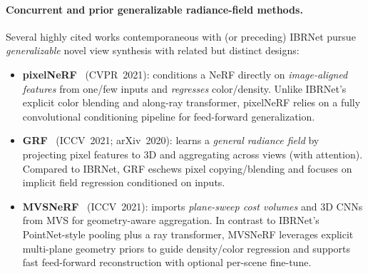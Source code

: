 \begin{enrichment}
\begin{enrichment}
     \paragraph{Concurrent and prior generalizable radiance-field methods.}
     Several highly cited works contemporaneous with (or preceding) IBRNet pursue \emph{generalizable} novel view synthesis with related but distinct designs:
     \begin{itemize}
         \item \textbf{pixelNeRF}~\cite{yu2020_pixelnerf} (CVPR~2021): conditions a NeRF directly on \emph{image-aligned features} from one/few inputs and \emph{regresses} color/density. Unlike IBRNet's explicit color blending and along-ray transformer, pixelNeRF relies on a fully convolutional conditioning pipeline for feed-forward generalization.
         \item \textbf{GRF}~\cite{trevithick2021_grf} (ICCV~2021; arXiv~2020): learns a \emph{general radiance field} by projecting pixel features to 3D and aggregating across views (with attention). Compared to IBRNet, GRF eschews pixel copying/blending and focuses on implicit field regression conditioned on inputs.
         \item \textbf{MVSNeRF}~\cite{chen2021_mvsnerf} (ICCV~2021): imports \emph{plane-sweep cost volumes} and 3D CNNs from MVS for geometry-aware aggregation. In contrast to IBRNet’s PointNet-style pooling plus a ray transformer, MVSNeRF leverages explicit multi-plane geometry priors to guide density/color regression and supports fast feed-forward reconstruction with optional per-scene fine-tune.
     \end{itemize}
     

\end{enrichment}
\end{enrichment}
